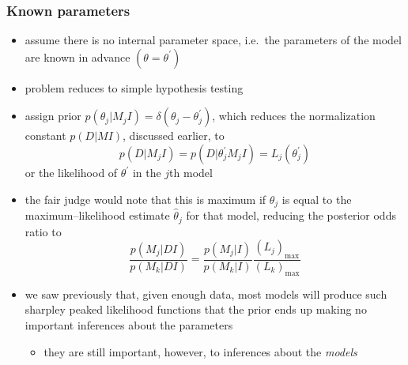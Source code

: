 \documentclass[../jaynes_prob_theory_notes.tex]{subfiles}
\begin{document}
            \subsubsection{Known parameters}
                \begin{itemize} 
                    \item assume there is no internal parameter space, i.e.\ the parameters of the model are known in advance \((\theta = {\theta}^{\prime})\)
                    \item problem reduces to simple hypothesis testing
                    \item assign prior \(p(\theta_j | M_j I) = \delta (\theta_j - \theta^{\prime}_j)\), which reduces the normalization constant \(p(D|MI)\), discussed earlier, to
                        \begin{equation*} 
                            p(D|M_j I) = p(D| \theta^{\prime}_j M_j I) = L_j (\theta^{\prime}_j)
                        \end{equation*}
                        or the likelihood of \(\theta^{\prime}\) in the \(j\)th model
                    \item the fair judge would note that this is maximum if \(\theta_j\) is equal to the maximum--likelihood estimate \(\hat{\theta}_j\) for that model, reducing the posterior odds ratio to
                        \begin{equation} 
                            \label{fair_odds}
                            \frac{p(M_j|DI)}{p(M_k|DI)} = \frac{p(M_j|I)}{p(M_k|I)}\frac{{(L_j)}_{\max}}{{(L_k)}_{\max}}
                        \end{equation}
                    \item we saw previously that, given enough data, most models will produce such sharpley peaked likelihood functions that the prior ends up making no important inferences about the parameters
                        \begin{itemize} 
                            \item they are still important, however, to inferences about the \textit{models}
                        \end{itemize}
                \end{itemize}
\end{document}
